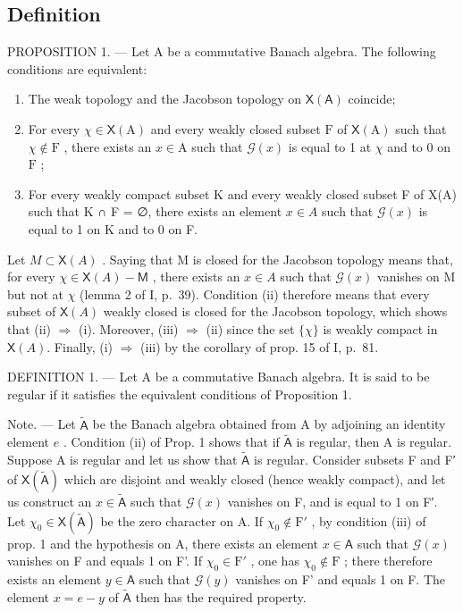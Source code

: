 \subsection{Definition}

PROPOSITION 1. --- Let A be a commutative Banach algebra. The following conditions are equivalent:

\begin{enumerate}
\def\labelenumi{(\roman{enumi})}
\item
  The weak topology and the Jacobson topology on \(\mathsf{X}(\mathsf{A})\) coincide;
\item
  For every \(\chi \in \mathsf{X}(\mathrm{A})\) and every weakly closed subset \(\mathrm{F}\) of \(\mathsf{X}(\mathrm{A})\) such that \(\chi \notin \mathrm{F}\) , there exists an \(x \in \mathrm{A}\) such that \(\mathcal{G}(x)\) is equal to 1 at \(\chi\) and to 0 on \(\mathrm{F}\) ;
\item
  For every weakly compact subset K and every weakly closed subset F of X(A) such that K ∩ F = ∅, there exists an element \(x \in A\) such that \(\mathcal{G}(x)\) is equal to 1 on K and to 0 on F.
\end{enumerate}

Let \(M \subset \mathsf{X}(A)\) . Saying that M is closed for the Jacobson topology means that, for every \(\chi \in \mathsf{X}(A) - \mathsf{M}\) , there exists an \(x \in A\) such that \(\mathcal{G}(x)\) vanishes on M but not at \(\chi\) (lemma 2 of I, p.~39). Condition (ii) therefore means that every subset of \(\mathsf{X}(A)\) weakly closed is closed for the Jacobson topology, which shows that (ii) \(\Longrightarrow\) (i). Moreover, (iii) \(\Longrightarrow\) (ii) since the set \(\{\chi\}\) is weakly compact in \(\mathsf{X}(A)\). Finally, (i) \(\Longrightarrow\) (iii) by the corollary of prop. 15 of I, p.~81.

DEFINITION 1. --- Let A be a commutative Banach algebra. It is said to be regular if it satisfies the equivalent conditions of Proposition 1.

Note. --- Let \(\tilde{\mathsf{A}}\) be the Banach algebra obtained from A by adjoining an identity element \(e\) . Condition (ii) of Prop. 1 shows that if \(\tilde{\mathsf{A}}\) is regular, then A is regular. Suppose A is regular and let us show that \(\tilde{\mathsf{A}}\) is regular. Consider subsets F and F′ of \(\mathsf{X}(\tilde{\mathsf{A}})\) which are disjoint and weakly closed (hence weakly compact), and let us construct an \(x \in \tilde{\mathsf{A}}\) such that \(\mathcal{G}(x)\) vanishes on F, and is equal to 1 on F′. Let \(\chi_0 \in \mathsf{X}(\tilde{\mathsf{A}})\) be the zero character on A. If \(\chi_0 \notin \mathrm{F}'\) , by condition (iii) of prop. 1 and the hypothesis on A, there exists an element \(x \in \mathsf{A}\) such that \(\mathcal{G}(x)\) vanishes on F and equals 1 on F'. If \(\chi_0 \in \mathrm{F}'\) , one has \(\chi_0 \notin \mathrm{F}\) ; there therefore exists an element \(y \in \mathsf{A}\) such that \(\mathcal{G}(y)\) vanishes on F' and equals 1 on F. The element \(x = e - y\) of \(\tilde{\mathsf{A}}\) then has the required property.

